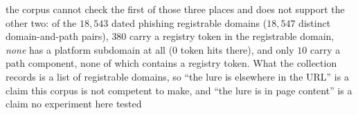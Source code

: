 the corpus cannot check the first of those three places and does not support the other two: of the $18{,}543$ dated phishing registrable domains ($18{,}547$ distinct domain-and-path pairs), $380$ carry a registry token in the registrable domain, \emph{none} has a platform subdomain at all ($0$ token hits there), and only $10$ carry a path component, none of which contains a registry token. What the collection records is a list of registrable domains, so ``the lure is elsewhere in the URL'' is a claim this corpus is not competent to make, and ``the lure is in page content'' is a claim no experiment here tested%
